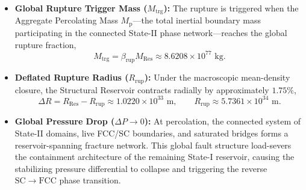 \begin{itemize}
    \item \textbf{Global Rupture Trigger Mass ($M_{\mathrm{trg}}$):}
    The rupture is triggered when the Aggregate Percolating Mass $M_{\mathrm{p}}$---the total inertial boundary mass participating in the connected State-II phase network---reaches the global rupture fraction,
    \begin{equation}
        M_{\mathrm{trg}}
        =
        \beta_{\mathrm{rup}}M_{\mathrm{Res}}
        \approx
        8.6208\times10^{77}\text{ kg}.
    \end{equation}

    \item \textbf{Deflated Rupture Radius ($R_{\mathrm{rup}}$):}
    Under the macroscopic mean-density closure, the Structural Reservoir contracts radially by approximately $1.75\%$,
    \begin{equation}
        \Delta R
        =
        R_{\mathrm{Res}}-R_{\mathrm{rup}}
        \approx
        1.0220\times10^{33}\text{ m},
        \qquad
        R_{\mathrm{rup}}
        \approx
        5.7361\times10^{34}\text{ m}.
    \end{equation}

    \item \textbf{Global Pressure Drop ($\Delta P \to 0$):}
    At percolation, the connected system of State-II domains, live FCC/SC boundaries, and saturated bridges forms a reservoir-spanning fracture network. This global fault structure load-severs the containment architecture of the remaining State-I reservoir, causing the stabilizing pressure differential to collapse and triggering the reverse $\mathrm{SC}\longrightarrow\mathrm{FCC}$ phase transition.
\end{itemize}

